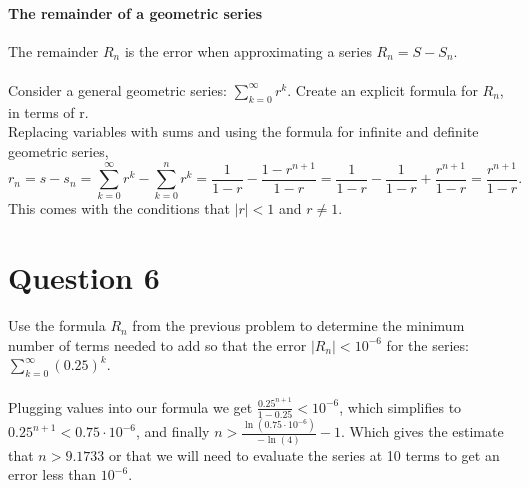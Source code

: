 \documentclass[a4paper]{article}
\begin{document}
\paragraph{The remainder of a geometric series \\} 

The remainder $ R_n $ is the error when approximating a series $ R_n = S- S_n $. \\ \\

Consider a general geometric series: $ \sum_{ k=0 } ^{ \infty } r^{ k } $. Create an explicit formula for $ R_n $, in terms of r. \\

Replacing variables with sums and using the formula for infinite and definite geometric series,
\[
r_n = s - s_n = \sum_{ k=0 } ^{ \infty } r^{ k } - \sum_{ k=0 } ^{ n } r^{ k } = \frac{ 1 }{ 1-r } - \frac{ 1-r^{ n+1 } }{ 1-r } = \frac{ 1 }{ 1-r } - \frac{ 1 }{ 1-r } + \frac{ r^{ n+1 } }{ 1-r } = \frac{ r^{ n+1 } }{ 1-r }
.\] 
This comes with the conditions that $ \left| r \right| < 1 $ and $ r \neq 1 $.

\section*{Question 6}%
\label{sec:Question 6}
Use the formula $ R_n $ from the previous problem to determine the minimum number of terms needed to add so that the error $ \left| R_n \right| < 10^{ -6 } $ for the series: $ \sum_{ k=0 } ^{ \infty } \left( 0.25 \right) ^{ k } $. \\ \\ 

Plugging values into our formula we get $ \frac{ 0.25^{ n+1 } }{ 1-0.25 } < 10^{ -6 } $, which simplifies to $ 0.25^{ n+1 } < 0.75 \cdot 10^{ -6 } $, and finally $  n > \frac{ \ln \left( 0.75\cdot 10^{ -6 } \right)  }{ -\ln\left( 4 \right)  } - 1  $. Which gives the estimate that $ n> 9.1733 $ or that we will need to evaluate the series at 10 terms to get an error less than $ 10^{ -6 } $.
\end{document}
